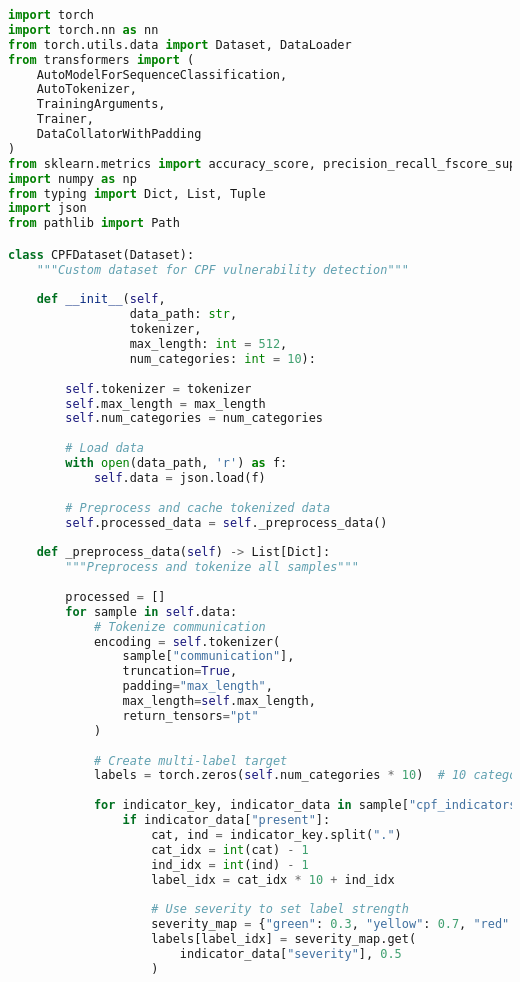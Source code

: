 \documentclass[11pt,a4paper]{article}
\begin{document}
\begin{lstlisting}[language=Python, caption=CPF Model Training Pipeline]
import torch
import torch.nn as nn
from torch.utils.data import Dataset, DataLoader
from transformers import (
    AutoModelForSequenceClassification,
    AutoTokenizer,
    TrainingArguments,
    Trainer,
    DataCollatorWithPadding
)
from sklearn.metrics import accuracy_score, precision_recall_fscore_support
import numpy as np
from typing import Dict, List, Tuple
import json
from pathlib import Path

class CPFDataset(Dataset):
    """Custom dataset for CPF vulnerability detection"""
    
    def __init__(self, 
                 data_path: str,
                 tokenizer,
                 max_length: int = 512,
                 num_categories: int = 10):
        
        self.tokenizer = tokenizer
        self.max_length = max_length
        self.num_categories = num_categories
        
        # Load data
        with open(data_path, 'r') as f:
            self.data = json.load(f)
        
        # Preprocess and cache tokenized data
        self.processed_data = self._preprocess_data()
    
    def _preprocess_data(self) -> List[Dict]:
        """Preprocess and tokenize all samples"""
        
        processed = []
        for sample in self.data:
            # Tokenize communication
            encoding = self.tokenizer(
                sample["communication"],
                truncation=True,
                padding="max_length",
                max_length=self.max_length,
                return_tensors="pt"
            )
            
            # Create multi-label target
            labels = torch.zeros(self.num_categories * 10)  # 10 categories x 10 indicators
            
            for indicator_key, indicator_data in sample["cpf_indicators"].items():
                if indicator_data["present"]:
                    cat, ind = indicator_key.split(".")
                    cat_idx = int(cat) - 1
                    ind_idx = int(ind) - 1
                    label_idx = cat_idx * 10 + ind_idx
                    
                    # Use severity to set label strength
                    severity_map = {"green": 0.3, "yellow": 0.7, "red": 1.0}
                    labels[label_idx] = severity_map.get(
                        indicator_data["severity"], 0.5
                    )
            

\end{lstlisting}
\end{document}
